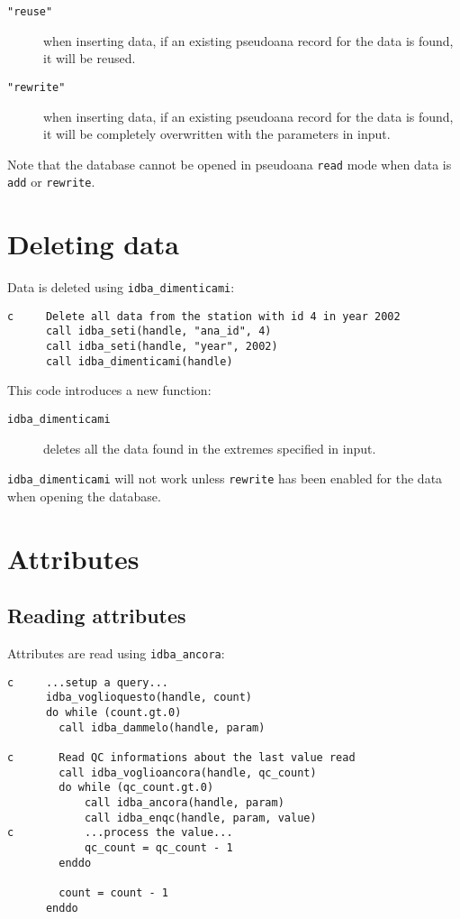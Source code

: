 \documentclass[final,12pt,a4paper,twoside]{book}
\begin{document}
\begin{description}
\item[{\tt "reuse"}] when inserting data, if an existing pseudoana record for
	       the data is found, it will be reused.
\item[{\tt "rewrite"}] when inserting data, if an existing pseudoana record for
	     the data is found, it will be completely overwritten with
	     the parameters in input.
\end{description}

Note that the database cannot be opened in pseudoana {\tt read} mode when data
is {\tt add} or {\tt rewrite}.
  
\section{Deleting data}

Data is deleted using {\tt idba\_dimenticami}:
\label{fun-idba_dimenticami}

\begin{verbatim}
c     Delete all data from the station with id 4 in year 2002
      call idba_seti(handle, "ana_id", 4)
      call idba_seti(handle, "year", 2002)
      call idba_dimenticami(handle)
\end{verbatim}

This code introduces a new function:

\begin{description}
\item[{\tt idba\_dimenticami}]
  deletes all the data found in the extremes specified in input.
\end{description}

{\tt idba\_dimenticami} will not work unless {\tt rewrite} has been enabled for
the data when opening the database.

\section {Attributes}

\subsection{Reading attributes}

Attributes are read using {\tt idba\_ancora}:
\label{fun-idba_voglioancora}
\label{fun-idba_ancora}

\begin{verbatim}
c     ...setup a query...
      idba_voglioquesto(handle, count)
      do while (count.gt.0)
        call idba_dammelo(handle, param)

c       Read QC informations about the last value read
        call idba_voglioancora(handle, qc_count)
        do while (qc_count.gt.0)
            call idba_ancora(handle, param) 
            call idba_enqc(handle, param, value)
c           ...process the value...
            qc_count = qc_count - 1
        enddo

        count = count - 1
      enddo
\end{verbatim}
\end{document}
